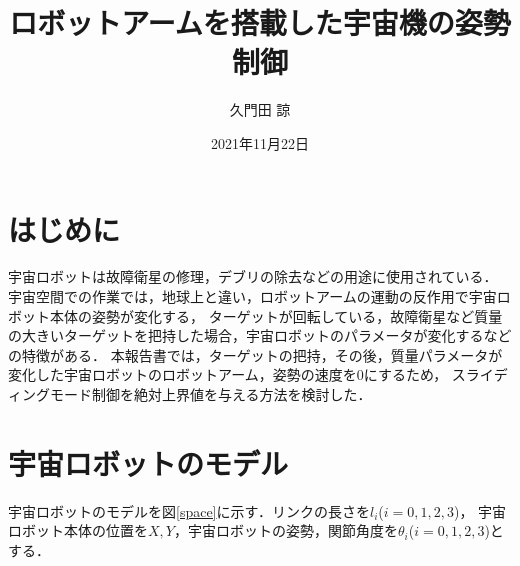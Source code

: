 \documentclass[10pt, a4j, uplatex, dvipdfmx, twocolumn]{jsarticle}
\title{ロボットアームを搭載した宇宙機の姿勢制御}%
\author{久門田 諒}                                %
\date{2021年11月22日}                            %
\begin{document}
\maketitle

\section{はじめに}
宇宙ロボットは故障衛星の修理，デブリの除去などの用途に使用されている．
宇宙空間での作業では，地球上と違い，ロボットアームの運動の反作用で宇宙ロボット本体の姿勢が変化する，
ターゲットが回転している，故障衛星など質量の大きいターゲットを把持した場合，宇宙ロボットのパラメータが変化するなどの特徴がある．
本報告書では，ターゲットの把持，その後，質量パラメータが変化した宇宙ロボットのロボットアーム，姿勢の速度を0にするため，
スライディングモード制御を絶対上界値を与える方法\cite{nonami}を検討した．
\section{宇宙ロボットのモデル}
宇宙ロボットのモデルを図\ref{space}に示す．リンクの長さを$l_i$($i=0,1,2,3$)，
宇宙ロボット本体の位置を$X,Y$，宇宙ロボットの姿勢，関節角度を$\theta_i$($i=0,1,2,3$)とする．
\end{document}
